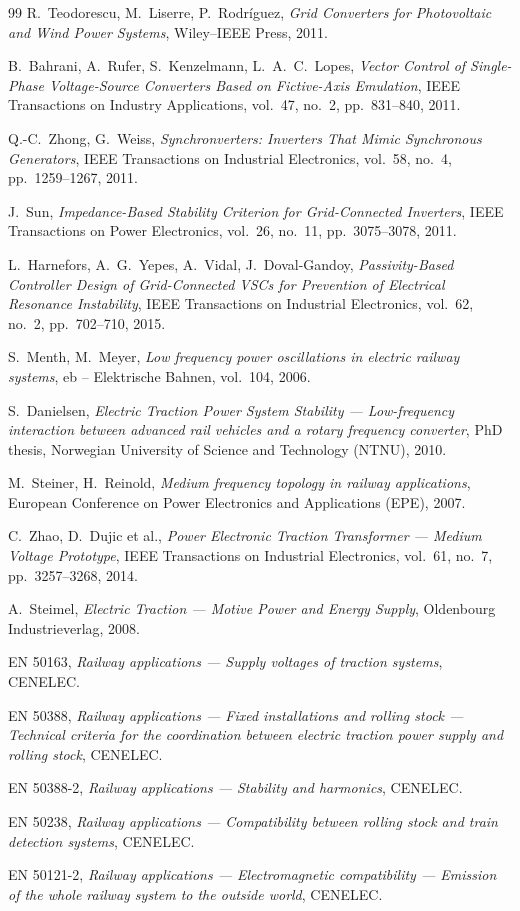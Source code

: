 \documentclass[11pt,a4paper]{article}
\begin{document}
\begin{thebibliography}{99}
R.~Teodorescu, M.~Liserre, P.~Rodríguez,
\emph{Grid Converters for Photovoltaic and Wind Power Systems},
Wiley--IEEE Press, 2011.

B.~Bahrani, A.~Rufer, S.~Kenzelmann, L.~A.~C.~Lopes,
\emph{Vector Control of Single-Phase Voltage-Source Converters Based on Fictive-Axis
Emulation},
IEEE Transactions on Industry Applications, vol.~47, no.~2, pp.~831--840, 2011.

Q.-C.~Zhong, G.~Weiss,
\emph{Synchronverters: Inverters That Mimic Synchronous Generators},
IEEE Transactions on Industrial Electronics, vol.~58, no.~4, pp.~1259--1267, 2011.

J.~Sun,
\emph{Impedance-Based Stability Criterion for Grid-Connected Inverters},
IEEE Transactions on Power Electronics, vol.~26, no.~11, pp.~3075--3078, 2011.

L.~Harnefors, A.~G.~Yepes, A.~Vidal, J.~Doval-Gandoy,
\emph{Passivity-Based Controller Design of Grid-Connected VSCs for Prevention of
Electrical Resonance Instability},
IEEE Transactions on Industrial Electronics, vol.~62, no.~2, pp.~702--710, 2015.

S.~Menth, M.~Meyer,
\emph{Low frequency power oscillations in electric railway systems},
eb -- Elektrische Bahnen, vol.~104, 2006.

S.~Danielsen,
\emph{Electric Traction Power System Stability --- Low-frequency interaction between
advanced rail vehicles and a rotary frequency converter},
PhD thesis, Norwegian University of Science and Technology (NTNU), 2010.

M.~Steiner, H.~Reinold,
\emph{Medium frequency topology in railway applications},
European Conference on Power Electronics and Applications (EPE), 2007.

C.~Zhao, D.~Dujic et al.,
\emph{Power Electronic Traction Transformer --- Medium Voltage Prototype},
IEEE Transactions on Industrial Electronics, vol.~61, no.~7, pp.~3257--3268, 2014.

A.~Steimel,
\emph{Electric Traction --- Motive Power and Energy Supply},
Oldenbourg Industrieverlag, 2008.

EN 50163, \emph{Railway applications --- Supply voltages of traction systems}, CENELEC.

EN 50388, \emph{Railway applications --- Fixed installations and rolling stock ---
Technical criteria for the coordination between electric traction power supply and
rolling stock}, CENELEC.

EN 50388-2, \emph{Railway applications --- Stability and harmonics}, CENELEC.

EN 50238, \emph{Railway applications --- Compatibility between rolling stock and train
detection systems}, CENELEC.

EN 50121-2, \emph{Railway applications --- Electromagnetic compatibility --- Emission of
the whole railway system to the outside world}, CENELEC.

\end{thebibliography}
\end{document}
